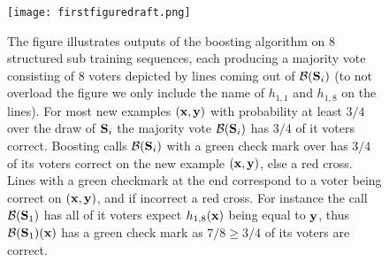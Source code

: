 \begin{figure}[h]
    \centering
    \texttt{[image: firstfiguredraft.png]}
    \caption{The figure illustrates outputs of the boosting algorithm on $ 8 $  structured sub training sequences, each producing a majority vote consisting of $ 8 $ voters depicted by lines coming out of $ \mathcal{B}(\mathbf{S}_{i}) $ (to not overload the figure we only include the name of $ h_{1,1}$ and $h_{1,8}$ on the lines). For most new examples $ (\mathbf{x},\mathbf{y}) $ with probability at least $ 3/4 $ over the draw of $ \mathbf{S}_{i} $  the majority vote $ \mathcal{B}(\mathbf{S}_{i}) $ has $ 3/4 $ of it voters correct. Boosting calls $ \mathcal{B}(\mathbf{S}_{i}) $ with a green check mark over has $ 3/4 $ of its voters correct on the new example $ (\mathbf{x},\mathbf{y}) $, else a red cross. Lines with a green checkmark at the end correspond to a voter being correct on $ (\mathbf{x},\mathbf{y}) $, and if incorrect a red cross. For instance the call $ \mathcal{B}(\mathbf{S}_{1}) $ has all of it voters expect $ h_{1,8}(\mathbf{x}) $ being equal to $ \mathbf{y} $, thus $ \mathcal{B}(\mathbf{S}_{1})(\mathbf{x}) $ has a green check mark as $ 7/8\geq 3/4 $ of its voters are correct.}
    \label{fig:first_figure}
\end{figure}

